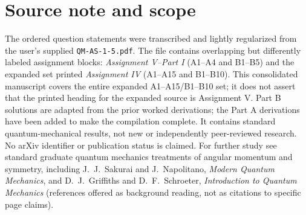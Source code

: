 \documentclass[11pt,a4paper]{article}
\theoremstyle{definition}
\begin{document}
\section*{Source note and scope}
The ordered question statements were transcribed and lightly regularized from the user's supplied \texttt{QM-AS-1-5.pdf}. The file contains overlapping but differently labeled assignment blocks: \emph{Assignment V--Part I} (A1--A4 and B1--B5) and the expanded set printed \emph{Assignment IV} (A1--A15 and B1--B10). This consolidated manuscript covers the entire expanded A1--A15/B1--B10 set; it does not assert that the printed heading for the expanded source is Assignment V. Part B solutions are adapted from the prior worked derivations; the Part A derivations have been added to make the compilation complete. It contains standard quantum-mechanical results, not new or independently peer-reviewed research. No arXiv identifier or publication status is claimed. For further study see standard graduate quantum mechanics treatments of angular momentum and symmetry, including J.~J.~Sakurai and J.~Napolitano, \emph{Modern Quantum Mechanics}, and D.~J.~Griffiths and D.~F.~Schroeter, \emph{Introduction to Quantum Mechanics} (references offered as background reading, not as citations to specific page claims).
\end{document}
